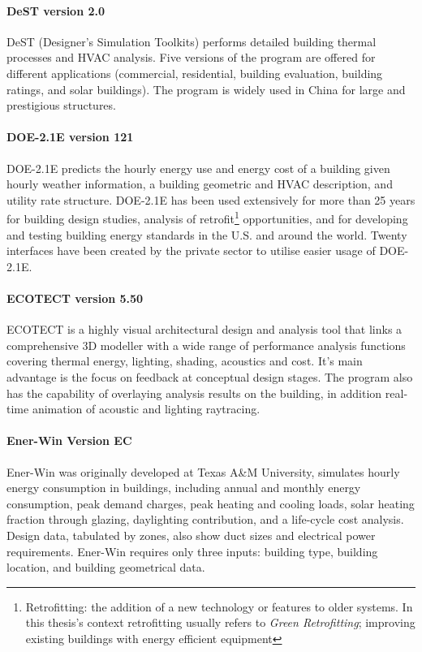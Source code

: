 \paragraph{DeST version 2.0} DeST (Designer's Simulation Toolkits) performs detailed building thermal processes and HVAC analysis. Five versions of the program are offered for different applications (commercial, residential, building evaluation, building ratings, and solar buildings). The program is widely used in China for large and prestigious structures.

\paragraph{DOE-2.1E version 121} DOE-2.1E predicts the hourly energy use and energy cost of a building given hourly weather information, a building geometric and HVAC description, and utility rate structure. DOE-2.1E has been used extensively for more than 25 years for building design studies, analysis of retrofit\footnote{Retrofitting: the addition of a new technology or features to older systems. In this thesis's context retrofitting usually refers to \emph{Green Retrofitting}; improving existing buildings with energy efficient equipment} opportunities, and for developing and testing building energy standards in the U.S. and around the world. Twenty interfaces have been created by the private sector to utilise easier usage of DOE-2.1E. \label{par:DOE}

\paragraph{ECOTECT version 5.50} ECOTECT is a highly visual architectural design and analysis tool that links a comprehensive 3D modeller with a wide range of performance analysis functions covering thermal energy, lighting, shading, acoustics and cost. It's main advantage is the focus on feedback at conceptual design stages. The program also has the capability of overlaying analysis results on the building, in addition real-time animation of acoustic and lighting raytracing. \label{par:ECOTECT}

\paragraph{Ener-Win Version EC} Ener-Win was originally developed at Texas A\&M University, simulates hourly energy consumption in buildings, including annual and monthly energy consumption, peak demand charges, peak heating and cooling loads, solar heating fraction through glazing, daylighting contribution, and a life-cycle cost analysis. Design data, tabulated by zones, also show duct sizes and electrical power requirements. Ener-Win requires only three inputs: building type, building location, and building geometrical data.

